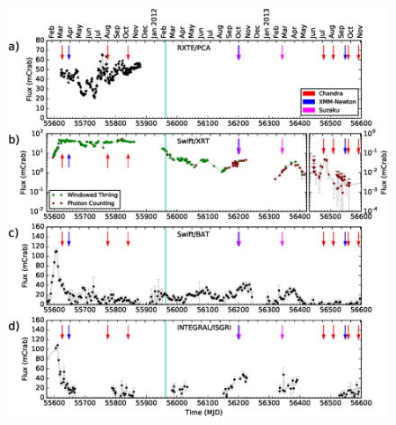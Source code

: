 \begin{figure}
    \includegraphics[width=\columnwidth, trim = {0.75cm 1.0cm 1.0cm 0.8cm},clip]{images/allmis.eps}
    \captionsetup{singlelinecheck=off}

\end{figure}
